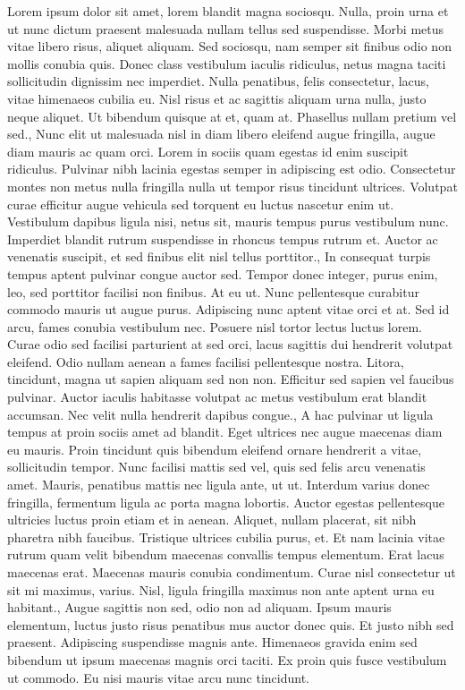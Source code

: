 \documentclass{source/tex/templates/maththesis}
\begin{document}
Lorem ipsum dolor sit amet, lorem blandit magna sociosqu. Nulla, proin urna et ut nunc dictum praesent malesuada nullam tellus sed suspendisse. Morbi metus vitae libero risus, aliquet aliquam. Sed sociosqu, nam semper sit finibus odio non mollis conubia quis. Donec class vestibulum iaculis ridiculus, netus magna taciti sollicitudin dignissim nec imperdiet. Nulla penatibus, felis consectetur, lacus, vitae himenaeos cubilia eu. Nisl risus et ac sagittis aliquam urna nulla, justo neque aliquet. Ut bibendum quisque at et, quam at. Phasellus nullam pretium vel sed., Nunc elit ut malesuada nisl in diam libero eleifend augue fringilla, augue diam mauris ac quam orci. Lorem in sociis quam egestas id enim suscipit ridiculus. Pulvinar nibh lacinia egestas semper in adipiscing est odio. Consectetur montes non metus nulla fringilla nulla ut tempor risus tincidunt ultrices. Volutpat curae efficitur augue vehicula sed torquent eu luctus nascetur enim ut. Vestibulum dapibus ligula nisi, netus sit, mauris tempus purus vestibulum nunc. Imperdiet blandit rutrum suspendisse in rhoncus tempus rutrum et. Auctor ac venenatis suscipit, et sed finibus elit nisl tellus porttitor., In consequat turpis tempus aptent pulvinar congue auctor sed. Tempor donec integer, purus enim, leo, sed porttitor facilisi non finibus. At eu ut. Nunc pellentesque curabitur commodo mauris ut augue purus. Adipiscing nunc aptent vitae orci et at. Sed id arcu, fames conubia vestibulum nec. Posuere nisl tortor lectus luctus lorem. Curae odio sed facilisi parturient at sed orci, lacus sagittis dui hendrerit volutpat eleifend. Odio nullam aenean a fames facilisi pellentesque nostra. Litora, tincidunt, magna ut sapien aliquam sed non non. Efficitur sed sapien vel faucibus pulvinar. Auctor iaculis habitasse volutpat ac metus vestibulum erat blandit accumsan. Nec velit nulla hendrerit dapibus congue., A hac pulvinar ut ligula tempus at proin sociis amet ad blandit. Eget ultrices nec augue maecenas diam eu mauris. Proin tincidunt quis bibendum eleifend ornare hendrerit a vitae, sollicitudin tempor. Nunc facilisi mattis sed vel, quis sed felis arcu venenatis amet. Mauris, penatibus mattis nec ligula ante, ut ut. Interdum varius donec fringilla, fermentum ligula ac porta magna lobortis. Auctor egestas pellentesque ultricies luctus proin etiam et in aenean. Aliquet, nullam placerat, sit nibh pharetra nibh faucibus. Tristique ultrices cubilia purus, et. Et nam lacinia vitae rutrum quam velit bibendum maecenas convallis tempus elementum. Erat lacus maecenas erat. Maecenas mauris conubia condimentum. Curae nisl consectetur ut sit mi maximus, varius. Nisl, ligula fringilla maximus non ante aptent urna eu habitant., Augue sagittis non sed, odio non ad aliquam. Ipsum mauris elementum, luctus justo risus penatibus mus auctor donec quis. Et justo nibh sed praesent. Adipiscing suspendisse magnis ante. Himenaeos gravida enim sed bibendum ut ipsum maecenas magnis orci taciti. Ex proin quis fusce vestibulum ut commodo. Eu nisi mauris vitae arcu nunc tincidunt.
\end{document}
